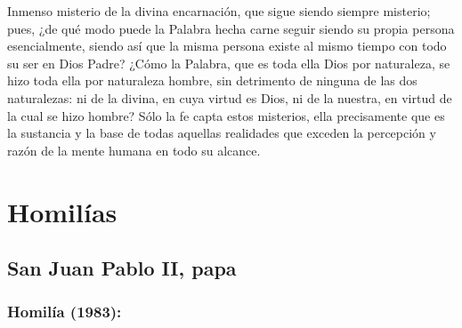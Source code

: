 \begin{body}
				Inmenso misterio de la divina encarnación, que sigue siendo siempre misterio; pues, ¿de qué modo puede la Palabra hecha carne seguir siendo su propia persona esencialmente, siendo así que la misma persona existe al mismo tiempo con todo su ser en Dios Padre? ¿Cómo la Palabra, que es toda ella Dios por naturaleza, se hizo toda ella por naturaleza hombre, sin detrimento de ninguna de las dos naturalezas: ni de la divina, en cuya virtud es Dios, ni de la nuestra, en virtud de la cual se hizo hombre? Sólo la fe capta estos misterios, ella precisamente que es la sustancia y la base de todas aquellas realidades que exceden la percepción y razón de la mente humana en todo su alcance.
			\end{body}


\newsection


	\section{Homilías}
	
		\homiliasABC
		
		\subsection{San Juan Pablo II, papa}
		
			\subsubsection{Homilía (1983):}
			
				
				
